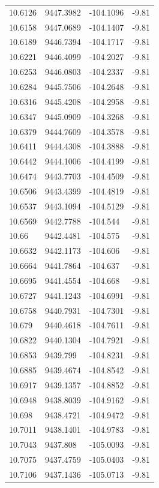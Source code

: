 \begin{table}[H]
\begin{tabular}{llll}
10.6126 & 9447.3982 & -104.1096 & -9.81 \\
10.6158 & 9447.0689 & -104.1407 & -9.81 \\
10.6189 & 9446.7394 & -104.1717 & -9.81 \\
10.6221 & 9446.4099 & -104.2027 & -9.81 \\
10.6253 & 9446.0803 & -104.2337 & -9.81 \\
10.6284 & 9445.7506 & -104.2648 & -9.81 \\
10.6316 & 9445.4208 & -104.2958 & -9.81 \\
10.6347 & 9445.0909 & -104.3268 & -9.81 \\
10.6379 & 9444.7609 & -104.3578 & -9.81 \\
10.6411 & 9444.4308 & -104.3888 & -9.81 \\
10.6442 & 9444.1006 & -104.4199 & -9.81 \\
10.6474 & 9443.7703 & -104.4509 & -9.81 \\
10.6506 & 9443.4399 & -104.4819 & -9.81 \\
10.6537 & 9443.1094 & -104.5129 & -9.81 \\
10.6569 & 9442.7788 & -104.544 & -9.81 \\
10.66 & 9442.4481 & -104.575 & -9.81 \\
10.6632 & 9442.1173 & -104.606 & -9.81 \\
10.6664 & 9441.7864 & -104.637 & -9.81 \\
10.6695 & 9441.4554 & -104.668 & -9.81 \\
10.6727 & 9441.1243 & -104.6991 & -9.81 \\
10.6758 & 9440.7931 & -104.7301 & -9.81 \\
10.679 & 9440.4618 & -104.7611 & -9.81 \\
10.6822 & 9440.1304 & -104.7921 & -9.81 \\
10.6853 & 9439.799 & -104.8231 & -9.81 \\
10.6885 & 9439.4674 & -104.8542 & -9.81 \\
10.6917 & 9439.1357 & -104.8852 & -9.81 \\
10.6948 & 9438.8039 & -104.9162 & -9.81 \\
10.698 & 9438.4721 & -104.9472 & -9.81 \\
10.7011 & 9438.1401 & -104.9783 & -9.81 \\
10.7043 & 9437.808 & -105.0093 & -9.81 \\
10.7075 & 9437.4759 & -105.0403 & -9.81 \\
10.7106 & 9437.1436 & -105.0713 & -9.81 \\

\end{tabular}
\end{table}
